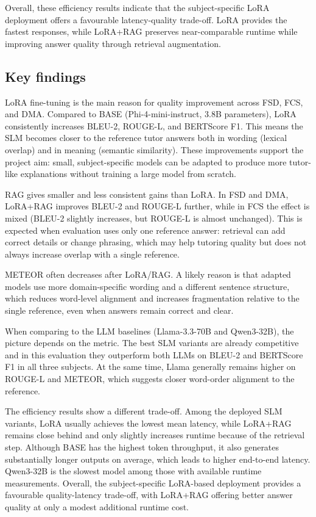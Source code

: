 Overall, these efficiency results indicate that the subject-specific LoRA deployment offers a favourable latency-quality trade-off. LoRA provides the fastest responses, while LoRA+RAG preserves near-comparable runtime while improving answer quality through retrieval augmentation.

\subsection{Key findings}
LoRA fine-tuning is the main reason for quality improvement across FSD, FCS, and DMA. Compared to BASE (Phi-4-mini-instruct, 3.8B parameters), LoRA consistently increases BLEU-2, ROUGE-L, and BERTScore F1. This means the SLM becomes closer to the reference tutor answers both in wording (lexical overlap) and in meaning (semantic similarity). These improvements support the project aim: small, subject-specific models can be adapted to produce more tutor-like explanations without training a large model from scratch.

RAG gives smaller and less consistent gains than LoRA. In FSD and DMA, LoRA+RAG improves BLEU-2 and ROUGE-L further, while in FCS the effect is mixed (BLEU-2 slightly increases, but ROUGE-L is almost unchanged). This is expected when evaluation uses only one reference answer: retrieval can add correct details or change phrasing, which may help tutoring quality but does not always increase overlap with a single reference.

METEOR often decreases after LoRA/RAG. A likely reason is that adapted models use more domain-specific wording and a different sentence structure, which reduces word-level alignment and increases fragmentation relative to the single reference, even when answers remain correct and clear.

When comparing to the LLM baselines (Llama-3.3-70B and Qwen3-32B), the picture depends on the metric. The best SLM variants are already competitive and in this evaluation they outperform both LLMs on BLEU-2 and BERTScore F1 in all three subjects. At the same time, Llama generally remains higher on ROUGE-L and METEOR, which suggests closer word-order alignment to the reference. 

The efficiency results show a different trade-off. Among the deployed SLM variants, LoRA usually achieves the lowest mean latency, while LoRA+RAG remains close behind and only slightly increases runtime because of the retrieval step. Although BASE has the highest token throughput, it also generates substantially longer outputs on average, which leads to higher end-to-end latency. Qwen3-32B is the slowest model among those with available runtime measurements. Overall, the subject-specific LoRA-based deployment provides a favourable quality-latency trade-off, with LoRA+RAG offering better answer quality at only a modest additional runtime cost.

